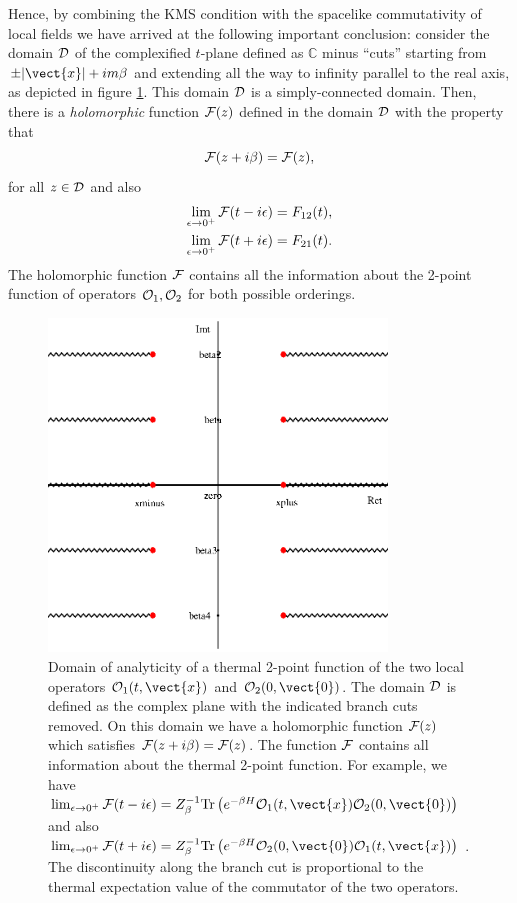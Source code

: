 Hence, by combining the KMS condition with the spacelike commutativity of local fields we have arrived at the following important conclusion: consider the domain ${\cal D}$ of the complexified $t$-plane defined as $\mathbb{C}$ minus ``cuts'' starting from $\pm|\vect{x}| + i m \beta$ and extending all the way to infinity parallel to the real axis, as depicted in figure \ref{analyticity}. This domain ${\cal D}$ is a simply-connected domain. Then, there is a {\it holomorphic} function ${\cal F}(z)$ defined in the domain ${\cal D}$ with the property that
\[
{\cal F}(z+i\beta) = {\cal F}(z) ,
\]
for all $z\in {\cal D}$ and also
\begin{align}
\nonumber
\lim_{\epsilon \rightarrow 0^+} {\cal F}(t-i \epsilon) = F_{12}(t), \\
\nonumber
\lim_{\epsilon \rightarrow 0^+} {\cal F}(t+i \epsilon) = F_{21}(t).
\end{align}
The holomorphic function ${\cal F}$ contains all the information about the 2-point function of operators ${\cal O}_1,{\cal O}_2$ for both possible orderings.
\begin{figure}
\begin{center}
\includegraphics[width=9cm]{analyt.eps}
\caption{Domain of analyticity of a thermal 2-point function of the two local operators ${\cal O}_1(t,\vect{x})$ and ${\cal O}_2(0,\vect{0})$. The domain ${\cal D}$ is defined as the complex plane with the indicated branch cuts removed. On this domain we have a holomorphic function ${\cal F}(z)$ which satisfies ${\cal F}(z+i\beta)= {\cal F}(z)$. The function ${\cal F}$ contains all information about the thermal 2-point function. For example, we have $\lim_{\epsilon\rightarrow 0^+}{\cal F}(t-i\epsilon) = Z_{\beta}^{-1}{\rm Tr}\left(e^{-\beta H} {\cal O}_1(t,\vect{x}) {\cal O}_2(0,\vect{0})\right)$ and also 
 $\lim_{\epsilon\rightarrow 0^+}{\cal F}(t+i\epsilon) = Z_{\beta}^{-1}{\rm Tr}\left(e^{-\beta H} {\cal O}_2(0,\vect{0}){\cal O}_1(t,\vect{x}) \right)$
. The discontinuity along the branch cut is proportional to the thermal expectation value of the commutator of the two operators.}
\label{analyticity}
\end{center}
\end{figure}

